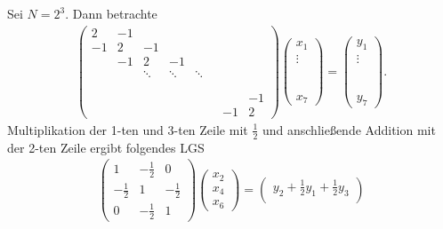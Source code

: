 \begin{Beispiel}
    Sei $N = 2^3$. Dann betrachte
    \begin{eqnarray*}
        \begin{pmatrix}
            2 & -1 \\
            -1 & 2 & -1 \\
            & -1 & 2 & -1 \\
            & & \ddots & \ddots & \ddots \\
            \\
            \\
            & & & & & & & -1 \\
            & & & & & & -1 & 2
        \end{pmatrix}
        \begin{pmatrix}
            x_1 \\ \vdots \\ \\ \\ \\ \\ \\ x_7
        \end{pmatrix}
        =
        \begin{pmatrix}
            y_1 \\ \vdots \\ \\ \\ \\ \\ \\ y_7
        \end{pmatrix}.
    \end{eqnarray*}
    Multiplikation der 1-ten und 3-ten Zeile mit $\frac{1}{2}$ und
    anschließende Addition mit der 2-ten Zeile ergibt folgendes LGS
    \begin{eqnarray*}
        \begin{pmatrix}
            1 & -\frac{1}{2} & 0 \\
            -\frac{1}{2} & 1 & -\frac{1}{2} \\
            0 & -\frac{1}{2} & 1
        \end{pmatrix}
        \begin{pmatrix}
            x_2 \\ x_4 \\ x_6
        \end{pmatrix}
        =
        \begin{pmatrix}
            y_2 + \frac{1}{2} y_1 + \frac{1}{2} y_3 \\

\end{pmatrix}
\end{eqnarray*}
\end{Beispiel}
